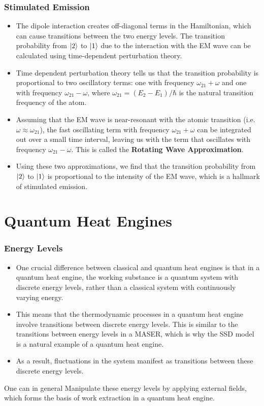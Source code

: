 \documentclass{beamer}
\begin{document}
    \begin{frame}
        \frametitle{Stimulated Emission}
        \begin{itemize}
            \item The dipole interaction creates off-diagonal terms in the Hamiltonian, which can cause transitions between the two energy levels. The transition probability from $\ket{2}$ to $\ket{1}$ due to the interaction with the EM wave can be calculated using time-dependent perturbation theory. \pause
            \item Time dependent perturbation theory tells us that the transition probability is proportional to two oscillatory terms: one with frequency $\omega_{21} + \omega$ and one with frequency $\omega_{21} - \omega$, where $\omega_{21} = (E_{2} - E_{1})/\hbar$ is the natural transition frequency of the atom. \pause
            \item Assuming that the EM wave is near-resonant with the atomic transition (i.e. $\omega \approx \omega_{21}$), the fast oscillating term with frequency $\omega_{21} + \omega$ can be integrated out over a small time interval, leaving us with the term that oscillates with frequency $\omega_{21} - \omega$. This is called the \textbf{Rotating Wave Approximation}. \pause
            \item Using these two approximations, we find that the transition probability from $\ket{2}$ to $\ket{1}$ is proportional to the intensity of the EM wave, which is a hallmark of stimulated emission.
        \end{itemize}
    \end{frame}
    \section{Quantum Heat Engines}
    \begin{frame}
        \frametitle{Energy Levels}
        \begin{itemize}
            \item One crucial difference between classical and quantum heat engines is that in a quantum heat engine, the working substance is a quantum system with discrete energy levels, rather than a classical system with continuously varying energy. \pause
            \item This means that the thermodynamic processes in a quantum heat engine involve transitions between discrete energy levels. This is similar to the transitions between energy levels in a MASER, which is why the SSD model is a natural example of a quantum heat engine. \pause
            \item As a result, fluctuations in the system manifest as transitions between these discrete energy levels. 
        \end{itemize}

        One can in general Manipulate these energy levels by applying external fields, which forms the basis of work extraction in a quantum heat engine.
    \end{frame}
\end{document}
